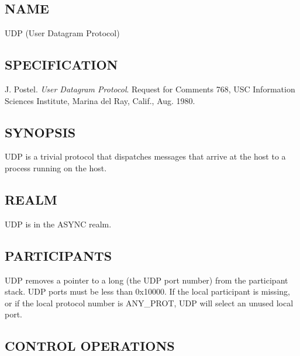 %
%
%

\subsection*{NAME}

\noindent UDP (User Datagram Protocol)

\subsection*{SPECIFICATION}

\noindent J. Postel. {\it User Datagram Protocol}. Request for Comments 
768, USC Information Sciences Institute, Marina del Ray, Calif., Aug. 1980.

\subsection*{SYNOPSIS}

\noindent UDP is a trivial protocol that dispatches messages that arrive 
at the host to a process running on the host.

\subsection*{REALM}

UDP is in the ASYNC realm.

\subsection*{PARTICIPANTS}

UDP removes a pointer to a long (the UDP port number) from the
participant stack.  UDP ports must be less than 0x10000.  
If the local participant is missing, or if the
local protocol number is ANY\_PROT, UDP will select an unused local
port. 


\subsection*{CONTROL OPERATIONS}

